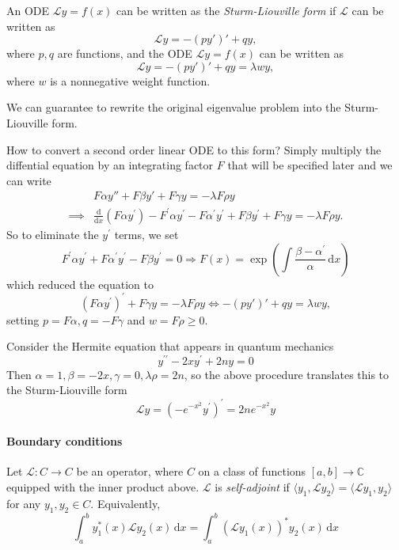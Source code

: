 \documentclass[a4paper]{article}
\begin{document}
\begin{definition}
    An ODE $ \mathcal{L}y=f(x) $ can be written as the \textit{Sturm-Liouville form} if $ \mathcal{L} $ can be written as
    \[
        \mathcal{L}y=-(py')'+qy,
    \]
    where $ p,q$ are functions, and the ODE $ \mathcal{L}y=f(x) $ can be written as 
    \begin{equation}
        \mathcal{L}y=-(py')'+qy=\lambda w y,
    \end{equation}
    where $w$ is a nonnegative weight function.
\end{definition}

We can guarantee to rewrite the original eigenvalue problem into the Sturm-Liouville form.

How to convert a second order linear ODE to this form?
Simply multiply the diffential equation by an integrating factor $F$ that will be specified later and we can write
\begin{align*}
    &F \alpha y''+F \beta y'+ F \gamma y = -\lambda F \rho y\\ 
    \implies&\frac{\mathrm d}{\mathrm dx}(F\alpha y^\prime)-F^\prime\alpha y^\prime-F\alpha^\prime y^\prime+F\beta y^\prime+F\gamma y=-\lambda F\rho y.
\end{align*}
So to eliminate the $y^\prime$ terms, we set
\begin{equation}
    F^\prime\alpha y^\prime+F\alpha^\prime y^\prime-F\beta y^\prime=0 \Longrightarrow  F(x)=\exp\left(\int\frac{\beta-\alpha^\prime}{\alpha}\,\mathrm dx\right)
\end{equation}
which reduced the equation to
$$(F\alpha y^\prime)^\prime+F\gamma y=-\lambda F\rho y \Longleftrightarrow -(py')'+qy=\lambda w y,$$
setting $p=F\alpha,q=-F\gamma$ and $w=F\rho\ge 0$.
\begin{example}
    Consider the Hermite equation that appears in quantum mechanics
    $$y^{\prime\prime}-2xy^\prime+2ny=0$$
    Then $\alpha=1,\beta=-2x,\gamma=0,\lambda\rho=2n$, so the above procedure translates this to the Sturm-Liouville form
    \begin{equation}\label{2.eq.9}
        \mathcal Ly=(-e^{-x^2}y^\prime)^\prime=2ne^{-x^2}y
    \end{equation}
\end{example}
\paragraph{Boundary conditions}

\begin{definition}
    Let $\mathcal L:C\to C$ be an operator, where $C$ on a class of functions $[a,b]\to\mathbb C$ equipped with the inner product above.
    $\mathcal L$ is \textit{self-adjoint} if $\langle y_1,\mathcal Ly_2\rangle=\langle\mathcal Ly_1,y_2\rangle$ for any $y_1,y_2\in C$. Equivalently,
    \begin{equation}
        \int_{a}^{b} y_1^*(x)\mathcal{L}y_2(x) \,\mathrm{d}x = \int_{a}^{b} (\mathcal{L}y_1(x))^* y_2(x) \,\mathrm{d}x
    \end{equation}
\end{definition}
\end{document}
